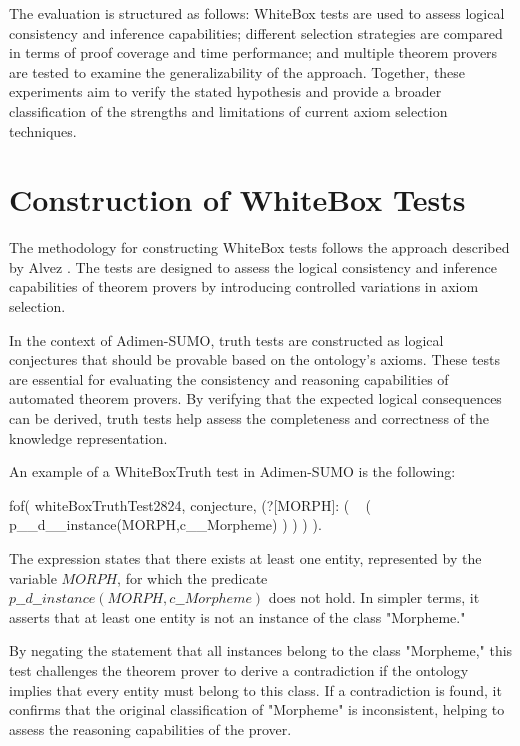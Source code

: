 \documentclass[english,version-2020-11]{uzl-thesis}
\begin{document}
The evaluation is structured as follows: WhiteBox tests are used to assess logical consistency and inference capabilities; different selection strategies are compared in terms of proof coverage and time performance; and multiple theorem provers are tested to examine the generalizability of the approach. Together, these experiments aim to verify the stated hypothesis and provide a broader classification of the strengths and limitations of current axiom selection techniques.


\section{Construction of WhiteBox Tests}

The methodology for constructing WhiteBox tests follows the approach described by Alvez \cite{Alvez2017}. The tests are designed to assess the logical consistency and inference capabilities of theorem provers by introducing controlled variations in axiom selection.

In the context of Adimen-SUMO, truth tests are constructed as logical conjectures that should be provable based on the ontology's axioms. These tests are essential for evaluating the consistency and reasoning capabilities of automated theorem provers. By verifying that the expected logical consequences can be derived, truth tests help assess the completeness and correctness of the knowledge representation. 

An example of a WhiteBoxTruth test in Adimen-SUMO is the following:

\begin{Pseudocode}[morekeywords = {add, create}, deletekeywords={to}, numbers=left,
    caption = {WhiteboxTruthTest example}]
    fof( whiteBoxTruthTest2824, conjecture,
        (?[MORPH]: 
            (
                ~ (
                    p__d__instance(MORPH,c__Morpheme)
                )
            )
        )
    ).
\end{Pseudocode}


The expression states that there exists at least one entity, represented by the variable \( MORPH \), for which the predicate \( p\_\_d\_\_instance(MORPH, c\_\_Morpheme) \) does not hold. In simpler terms, it asserts that at least one entity is not an instance of the class "Morpheme."

By negating the statement that all instances belong to the class "Morpheme," this test challenges the theorem prover to derive a contradiction if the ontology implies that every entity must belong to this class. If a contradiction is found, it confirms that the original classification of "Morpheme" is inconsistent, helping to assess the reasoning capabilities of the prover.
\end{document}
